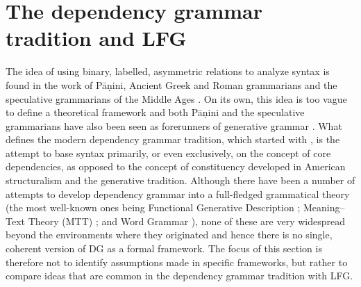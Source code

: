 \documentclass[output=paper,hidelinks]{langscibook}
\begin{document}
\section{The dependency grammar tradition and LFG}\label{sec:Dependency:keyideas}
The idea of using binary, labelled, asymmetric relations to analyze
syntax is found in the work of P\=aṇini, Ancient Greek and Roman grammarians and
the speculative grammarians of the Middle Ages
\citep{Covington1984}. On its own, this idea is too vague to define a
theoretical framework and both P\=aṇini and the speculative
grammarians have also been seen as forerunners of generative grammar
\citep{Kiparsky1994,Chomsky1966}. What defines the modern dependency
grammar tradition, which started with \citet{Tesniere1959}, is the attempt to base syntax primarily, or even
exclusively, on the concept of core dependencies, as opposed to the
concept of constituency developed in American structuralism and the
generative tradition. Although there have been a number of attempts to
develop dependency grammar into a full-fledged grammatical theory (the
most well-known ones being Functional Generative
Description \citep{SgallEtAl1986}; Meaning--Text Theory (MTT) \citep{Melcuk1988}; and
Word Grammar \citep{Hudson84,Hudson2010}), none of these are very
widespread beyond the environments where they originated and hence
there is no single, coherent version of DG as a formal framework.  The
focus of this section is therefore not to identify assumptions made in
specific frameworks, but rather to compare ideas that are common in
the dependency grammar tradition with LFG.
\end{document}
